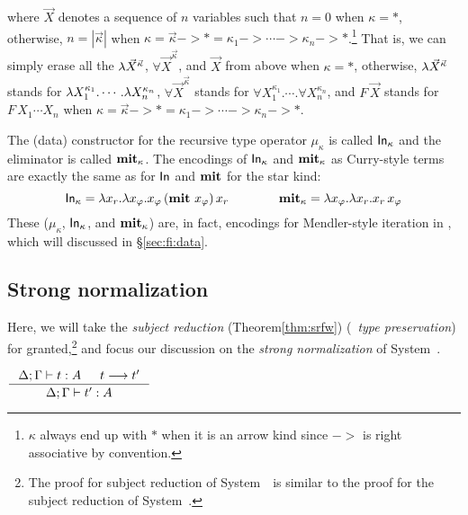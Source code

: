 where $\vec{X}$ denotes a sequence of $n$ variables
such that $n=0$ when $\kappa = *$, otherwise, $n = |\vec{\kappa}|$ when
$\kappa = \vec{\kappa} -> * = \kappa_1 -> \cdots -> \kappa_n -> *$.\footnote{
        $\kappa$ always end up with $*$ when it is an arrow kind
        since $->$ is right associative by convention.}
That is, we can simply erase all the $\lambda \vec{X}^{\vec{\kappa}}$,
$\forall \vec{X}^{\vec{\kappa}}$, and $\vec{X}$ from above when
$\kappa = *$, otherwise, $\lambda \vec{X}^{\vec{\kappa}}$ stands for
$\lambda X_1^{\kappa_1}.\cdots.\lambda X_n^{\kappa_n}$,
$\forall \vec{X}^{\vec{\kappa}}$ stands for
$\forall X_1^{\kappa_1}.\cdots.\forall X_n^{\kappa_n}$,
and $F\,\vec{X}$ stands for $F\,X_1\cdots X_n$
when $\kappa = \vec{\kappa} -> * = \kappa_1 -> \cdots -> \kappa_n -> *$.

The (data) constructor for the recursive type operator $\mu_\kappa$ is
called $\mathsf{In}_\kappa$ and the eliminator is called $\mathbf{mit}_\kappa$.
The encodings of $\mathsf{In}_\kappa$ and $\mathbf{mit}_\kappa$ as Curry-style terms are
exactly the same as for $\mathsf{In}$ and $\mathbf{mit}$ for the star kind:
\[ \mathsf{In}_\kappa = \lambda x_r. \lambda x_\varphi.x_\varphi\,(\mathbf{mit}~x_\varphi)\,x_r
\qquad\qquad \mathbf{mit}_\kappa = \lambda x_\varphi.\lambda x_r.x_r\,x_\varphi \]
These ($\mu_\kappa$, $\mathsf{In}_\kappa$, and $\mathbf{mit}_\kappa$) are, in fact,
encodings for Mendler-style iteration in \Fw, which will discussed in
\S\ref{sec:fi:data}.


\subsection{Strong normalization}\label{sec:fw:srsn}
Here, we will take the \emph{subject reduction} (Theorem\;\ref{thm:srfw})
(\aka\ \emph{type preservation}) for granted,\footnote{
	The proof for subject reduction of System~\Fw\ is similar to
	the proof for the subject reduction of System~\F.}
and focus our discussion on the \emph{strong normalization}
of System~\Fw.

\begin{theorem}\label{thm:srfw}
$\inference{\Delta;\Gamma |- t : A  & t --> t'}{\Delta;\Gamma |- t' : A}$
\end{theorem}

